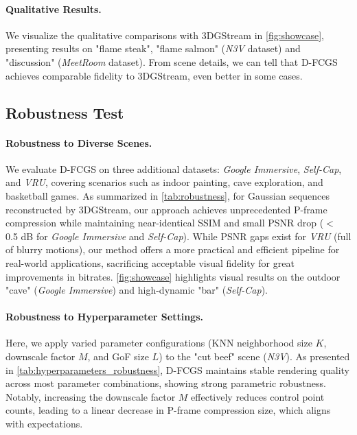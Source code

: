 \documentclass[letterpaper]{article} %
\begin{document}
\paragraph{\textbf{Qualitative Results.}} We visualize the qualitative comparisons with 3DGStream \cite{sun20243dgstream} in \cref{fig:showcase}, presenting results on "flame steak", "flame salmon" (\textit{N3V} dataset) and "discussion" (\textit{MeetRoom} dataset). From scene details, we can tell that D-FCGS achieves comparable fidelity to 3DGStream, even better in some cases.


\subsection{Robustness Test}
\label{sec:Q2}
\paragraph{Robustness to Diverse Scenes.}
We evaluate D-FCGS on three additional datasets: \textit{Google Immersive}, \textit{Self-Cap}, and \textit{VRU}, covering scenarios such as indoor painting, cave exploration, and basketball games. As summarized in \cref{tab:robustness}, for Gaussian sequences reconstructed by 3DGStream, our approach achieves unprecedented P-frame compression while maintaining near-identical SSIM and small PSNR drop ($<$ 0.5 dB for \textit{Google Immersive} and \textit{Self-Cap}). While PSNR gaps exist for \textit{VRU} (full of blurry motions), our method offers a more practical and efficient pipeline for real-world applications, sacrificing acceptable visual fidelity for great improvements in bitrates. \cref{fig:showcase} highlights visual results on the outdoor "cave" (\textit{Google Immersive}) and high-dynamic "bar" (\textit{Self-Cap}). 



\paragraph{Robustness to Hyperparameter Settings.} Here, we apply varied parameter configurations (KNN neighborhood size $K$, downscale factor $M$, and GoF size $L$) to the "cut beef" scene (\textit{N3V}). As presented in \cref{tab:hyperparameters_robustness}, D-FCGS maintains stable rendering quality across most parameter combinations, showing strong parametric robustness. Notably, increasing the downscale factor $M$ effectively reduces control point counts, leading to a linear decrease in P-frame compression size, which aligns with expectations.
\end{document}
